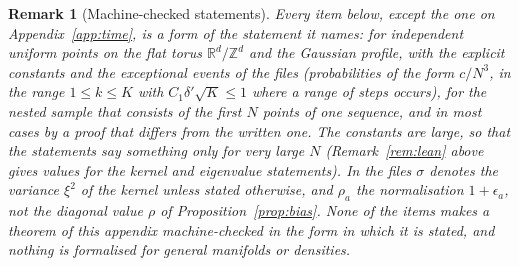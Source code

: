 \documentclass[11pt,a4paper]{article}
\theoremstyle{stmt}
\theoremstyle{defn}
\theoremstyle{rmk}
\newtheorem{remark}[theorem]{Remark}
\numberwithin{equation}{section}
\newcommand{\R}{\mathbb{R}}
\begin{document}
{\begin{remark}[Machine-checked statements]
Every item below, except the one on Appendix~\ref{app:time}, is a \emph{form} of the statement it names: for independent uniform points on the flat torus $\R^d/\mathbb Z^d$ and the Gaussian profile, with the explicit constants and the exceptional events of the files (probabilities of the form $c/N^3$, in the range $1\le k\le K$ with $C_1\delta'\sqrt K\le1$ where a range of steps occurs), for the nested sample that consists of the first $N$ points of one sequence, and in most cases by a proof that differs from the written one. The constants are large, so that the statements say something only for very large $N$ (Remark~\ref{rem:lean} above gives values for the kernel and eigenvalue statements). In the files $\sigma$ denotes the variance $\xi^2$ of the kernel unless stated otherwise, and $\rho_a$ the normalisation $1+\epsilon_a$, not the diagonal value $\rho$ of Proposition~\ref{prop:bias}. None of the items makes a theorem of this appendix machine-checked in the form in which it is stated, and nothing is formalised for general manifolds or densities.


\end{remark}}
\end{document}
